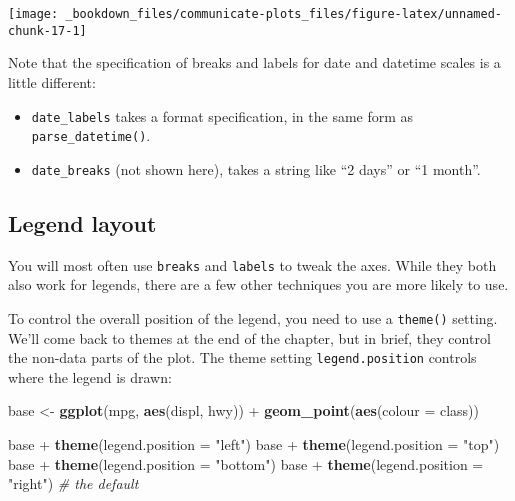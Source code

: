 \documentclass[]{book}
\newenvironment{Shaded}{\begin{snugshade}}{\end{snugshade}}
\newcommand{\KeywordTok}[1]{\textcolor[rgb]{0.13,0.29,0.53}{\textbf{{#1}}}}
\newcommand{\DataTypeTok}[1]{\textcolor[rgb]{0.13,0.29,0.53}{{#1}}}
\newcommand{\StringTok}[1]{\textcolor[rgb]{0.31,0.60,0.02}{{#1}}}
\newcommand{\CommentTok}[1]{\textcolor[rgb]{0.56,0.35,0.01}{\textit{{#1}}}}
\newcommand{\NormalTok}[1]{{#1}}
\begin{document}
\begin{center}\texttt{[image: \_bookdown\_files/communicate-plots\_files/figure-latex/unnamed-chunk-17-1]} \end{center}

Note that the specification of breaks and labels for date and datetime
scales is a little different:

\begin{itemize}
\item
  \texttt{date\_labels} takes a format specification, in the same form
  as \texttt{parse\_datetime()}.
\item
  \texttt{date\_breaks} (not shown here), takes a string like ``2 days''
  or ``1 month''.
\end{itemize}

\subsection{Legend layout}\label{legend-layout}

You will most often use \texttt{breaks} and \texttt{labels} to tweak the
axes. While they both also work for legends, there are a few other
techniques you are more likely to use.

To control the overall position of the legend, you need to use a
\texttt{theme()} setting. We'll come back to themes at the end of the
chapter, but in brief, they control the non-data parts of the plot. The
theme setting \texttt{legend.position} controls where the legend is
drawn:

\begin{Shaded}
\begin{Highlighting}[]
\NormalTok{base <-}\StringTok{ }\KeywordTok{ggplot}\NormalTok{(mpg, }\KeywordTok{aes}\NormalTok{(displ, hwy)) +}
\StringTok{  }\KeywordTok{geom_point}\NormalTok{(}\KeywordTok{aes}\NormalTok{(}\DataTypeTok{colour =} \NormalTok{class))}

\NormalTok{base +}\StringTok{ }\KeywordTok{theme}\NormalTok{(}\DataTypeTok{legend.position =} \StringTok{"left"}\NormalTok{)}
\NormalTok{base +}\StringTok{ }\KeywordTok{theme}\NormalTok{(}\DataTypeTok{legend.position =} \StringTok{"top"}\NormalTok{)}
\NormalTok{base +}\StringTok{ }\KeywordTok{theme}\NormalTok{(}\DataTypeTok{legend.position =} \StringTok{"bottom"}\NormalTok{)}
\NormalTok{base +}\StringTok{ }\KeywordTok{theme}\NormalTok{(}\DataTypeTok{legend.position =} \StringTok{"right"}\NormalTok{) }\CommentTok{# the default}
\end{Highlighting}
\end{Shaded}
\end{document}
